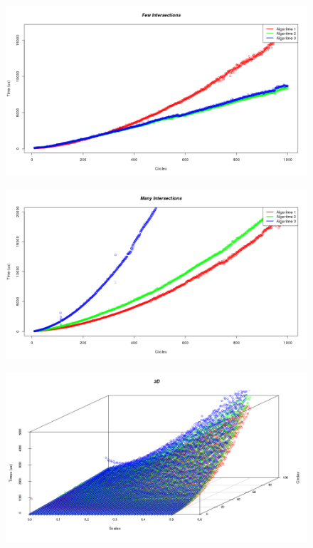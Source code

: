 \documentclass[12pt,a4paper]{article}
\begin{document}








\begin{figure}[H]
  \centering
  \includegraphics[width=1\textwidth]{illustraties/fewIntersections.png}
\end{figure}
\begin{figure}[H]
  \centering
  \includegraphics[width=1\textwidth]{illustraties/manyIntersections.png}
\end{figure}
\begin{figure}[H]
  \centering
  \includegraphics[width=1\textwidth]{illustraties/3DScatter.png}
\end{figure}
\end{document}
